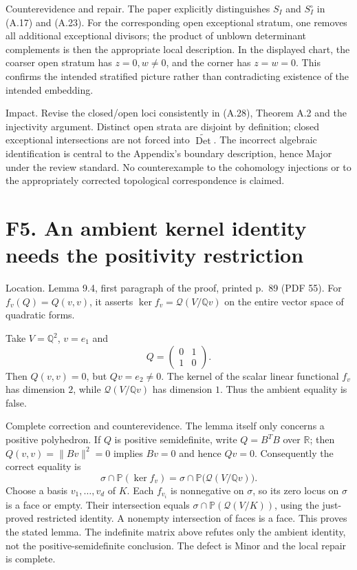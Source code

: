 \documentclass[10pt]{article}
\begin{document}
Counterevidence and repair. The paper explicitly distinguishes \(S_I\) and \(S_I^\circ\) in (A.17) and (A.23). For the corresponding open exceptional stratum, one removes all additional exceptional divisors; the product of unblown determinant complements is then the appropriate local description. In the displayed chart, the coarser open stratum has \(z=0,w\ne0\), and the corner has \(z=w=0\). This confirms the intended stratified picture rather than contradicting existence of the intended embedding.\par
Impact. Revise the closed/open loci consistently in (A.28), Theorem A.2 and the injectivity argument. Distinct open strata are disjoint by definition; closed exceptional intersections are not forced into \(\widetilde{\operatorname{Det}}\). The incorrect algebraic identification is central to the Appendix’s boundary description, hence Major under the review standard. No counterexample to the cohomology injections or to the appropriately corrected topological correspondence is claimed.\par
\section*{F5. An ambient kernel identity needs the positivity restriction}
Location. Lemma 9.4, first paragraph of the proof, printed p. 89 (PDF 55). For \(f_v(Q)=Q(v,v)\), it asserts \(\ker f_v=\mathcal Q(V/\mathbb Qv)\) on the entire vector space of quadratic forms.\par
Take \(V=\mathbb Q^2\), \(v=e_1\) and \[Q=\begin{pmatrix}0&1\\1&0\end{pmatrix}.\] Then \(Q(v,v)=0\), but \(Qv=e_2\ne0\). The kernel of the scalar linear functional \(f_v\) has dimension \(2\), while \(\mathcal Q(V/\mathbb Qv)\) has dimension \(1\). Thus the ambient equality is false.\par
Complete correction and counterevidence. The lemma itself only concerns a positive polyhedron. If \(Q\) is positive semidefinite, write \(Q=B^TB\) over \(\mathbb R\); then \(Q(v,v)=\|Bv\|^2=0\) implies \(Bv=0\) and hence \(Qv=0\). Consequently the correct equality is \[\sigma\cap\mathbb P(\ker f_v)
 =\sigma\cap\mathbb P\bigl(\mathcal Q(V/\mathbb Qv)\bigr).\] Choose a basis \(v_1,\ldots,v_d\) of \(K\). Each \(f_{v_i}\) is nonnegative on \(\sigma\), so its zero locus on \(\sigma\) is a face or empty. Their intersection equals \(\sigma\cap\mathbb P(\mathcal Q(V/K))\), using the just-proved restricted identity. A nonempty intersection of faces is a face. This proves the stated lemma. The indefinite matrix above refutes only the ambient identity, not the positive-semidefinite conclusion. The defect is Minor and the local repair is complete.\par
\end{document}

